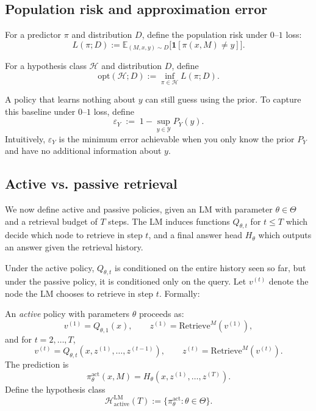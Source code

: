 \documentclass{llmxive}
\begin{document}
\subsection{Population risk and approximation error}

\begin{definition}
For a predictor \(\pi\) and distribution \(D\), define the population risk under \(0\)--\(1\) loss:
\[
  L(\pi; D) := \mathbb{E}_{(M,x,y)\sim D}\bigl[\mathbf{1}[\pi(x,M)\neq y]\bigr].
\]
\end{definition}

\begin{definition}
For a hypothesis class \(\mathcal{H}\) and distribution \(D\), define
\[
  \mathrm{opt}(\mathcal{H}; D) := \inf_{\pi\in\mathcal{H}} L(\pi; D).
\]
\end{definition}

A policy that learns nothing about \(y\) can still guess using the prior.
To capture this baseline under \(0\)--\(1\) loss, define 
\[
  \varepsilon_Y \;:=\; 1 - \sup_{y \in \mathcal{Y}} P_Y(y).
\]
Intuitively, \(\varepsilon_Y\) is the minimum error achievable when you only know the
prior \(P_Y\) and have no additional information about \(y\).

\subsection{Active vs. passive retrieval}

We now define active and passive policies, given an LM with parameter $\theta \in \Theta$ and a retrieval budget of \(T\) steps. The LM induces functions $Q_{\theta,t}$ for $t \le T$ which decide which node to retrieve in step $t$, and a final answer head $H_\theta$ which outputs an answer given the retrieval history. 

Under the active policy, $Q_{\theta,t}$ is conditioned on the entire history seen so far, but under the passive policy, it is conditioned only on the query. Let $v^{(t)}$ denote the node the LM chooses to retrieve in step $t$. Formally:

\begin{definition}
An \emph{active} policy with parameters \(\theta\) proceeds as:
\[
  v^{(1)} = Q_{\theta,1}(x), \qquad z^{(1)} = \mathrm{Retrieve}^M(v^{(1)}),
\]
and for \(t=2,\dots,T\),
\[
  v^{(t)} = Q_{\theta,t}(x, z^{(1)},\dots,z^{(t-1)}), \qquad z^{(t)} = \mathrm{Retrieve}^M(v^{(t)}).
\]
The prediction is
\[
  \pi^{\mathrm{act}}_\theta(x,M) = H_\theta(x, z^{(1)},\dots,z^{(T)}).
\]
Define the hypothesis class
\[
  \mathcal{H}^{\mathrm{LM}}_{\mathrm{active}}(T) := \{\pi^{\mathrm{act}}_\theta : \theta\in\Theta\}.
\]
\end{definition}
\end{document}
